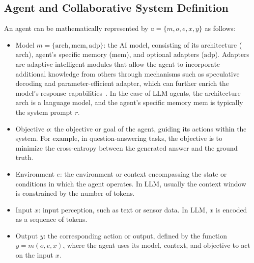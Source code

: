 \documentclass[acmsmall,nonacm]{acmart}
\begin{document}
    \subsection{Agent and Collaborative System Definition}
        \label{sec:Agent_system_def}
        An agent can be mathematically represented by $a=\{ m, o, e, x, y \}$ as follows:
        \begin{itemize}
            \item Model $m=\{\textrm{arch}, \textrm{mem}, \textrm{adp}\}$: the AI model, consisting of its architecture ($\textrm{arch}$), agent's specific memory ($\textrm{mem}$), and optional adapters ($\textrm{adp}$). Adapters are adaptive intelligent modules that allow the agent to incorporate additional knowledge from others through mechanisms such as speculative decoding and parameter-efficient adapter, which can further enrich the model’s response capabilities~\cite{8352646,introMAC,leviathan2023fast}. In the case of LLM agents, the architecture $\textrm{arch}$ is a language model, and the agent's specific memory $\textrm{mem}$ is typically the system prompt $r$.
            \item Objective $o$: the objective or goal of the agent, guiding its actions within the system. For example, in question-answering tasks, the objective is to minimize the cross-entropy between the generated answer and the ground truth.
            \item Environment $e$: the environment or context encompassing the state or conditions in which the agent operates. In LLM, usually the context window is constrained by the number of tokens.
            \item Input $x$: input perception, such as text or sensor data. In LLM, $x$ is encoded as a sequence of tokens.
            \item Output $y$: the corresponding action or output, defined by the function $y=m(o,e,x)$, where the agent uses its model, context, and objective to act on the input $x$.
        \end{itemize}
\end{document}
